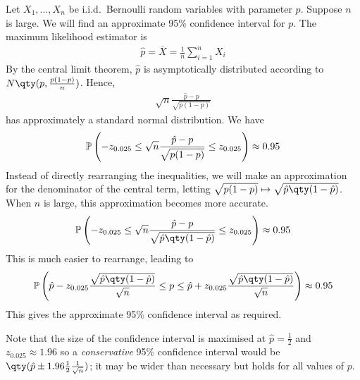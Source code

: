\begin{example}
	Let $X_1, \dots, X_n$ be i.i.d.\ Bernoulli random variables with parameter $p$.
	Suppose $n$ is large.
	We will find an approximate 95\% confidence interval for $p$.
	The maximum likelihood estimator is
	\begin{align*}
		\hat p = \overline X = \frac{1}{n} \sum_{i=1}^n X_i
	\end{align*}
	By the central limit theorem, $\hat p$ is asymptotically distributed according to $N\qty(p, \frac{p(1-p)}{n})$.
	Hence,
	\begin{align*}
		\sqrt{n}\frac{\hat p - p}{\sqrt{p(1-p)}}
	\end{align*}
	has approximately a standard normal distribution.
	We have
	\begin{align*}
		\mathbb{P}\left({-z_{0.025} \leq \sqrt{n}\frac{\hat p - p}{\sqrt{p(1-p)}} \leq z_{0.025}}\right) \approx 0.95
	\end{align*}
	Instead of directly rearranging the inequalities, we will make an approximation for the denominator of the central term, letting $\sqrt{p(1-p)} \mapsto \sqrt{\hat p\qty(1-\hat p)}$.
	When $n$ is large, this approximation becomes more accurate.
	\begin{align*}
		\prob{-z_{0.025} \leq \sqrt{n}\frac{\hat p - p}{\sqrt{\hat p\qty(1-\hat p)}} \leq z_{0.025}} \approx 0.95
	\end{align*}
	This is much easier to rearrange, leading to
	\begin{align*}
		\prob{\hat p - z_{0.025}\frac{\sqrt{\hat p\qty(1-\hat p)}}{\sqrt{n}} \leq p \leq \hat p + z_{0.025}\frac{\sqrt{\hat p\qty(1-\hat p)}}{\sqrt{n}}} \approx 0.95
	\end{align*}
	This gives the approximate 95\% confidence interval as required.
\end{example}

\begin{remark}
	Note that the size of the confidence interval is maximised at $\hat{p} = \frac{1}{2}$ and $z_{0.025} \approx 1.96$ so a \textit{conservative} 95\% confidence interval would be $\qty(\hat{p} \pm 1.96 \frac{1}{2} \frac{1}{\sqrt{n}})$; it may be wider than necessary but holds for all values of $p$.
\end{remark}

